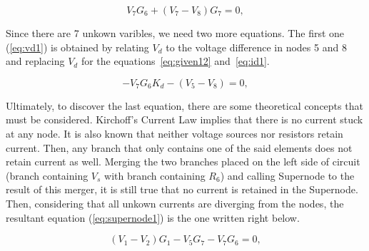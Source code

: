 \begin{equation}
  V_{7}G_{6} + (V_{7} - V_{8})G_{7} = 0,
  \label{eq:node17}
\end{equation}

Since there are 7 unkown varibles, we need two more equations. The first one (\ref{eq:vd1}) is obtained by relating $V_d$ to the voltage difference in nodes 5 and 8 and replacing $V_d$ for the equations~\ref{eq:given12} and~\ref{eq:id1}.

\begin{equation}
  -V_{7}G_{6}K_{d} - (V_{5} - V_{8}) = 0,
  \label{eq:vd1}
\end{equation}

Ultimately, to discover the last equation, there are some theoretical concepts that must be considered. Kirchoff's Current Law implies that there is no current stuck at any node. It is also known that neither voltage sources nor resistors retain current. Then, any branch that only contains one of the said elements does not retain current as well. Merging the two branches placed on the left side of circuit (branch containing $V_s$ with branch containing $R_6$) and calling Supernode to the result of this merger, it is still true that no current is retained in the Supernode. Then, considering that all unkown currents are diverging from the nodes, the resultant equation (\ref{eq:supernode1}) is the one written right below.

\begin{equation}
  (V_{1} - V_{2})G_{1} - V_{5}G_{7} - V_{7}G_{6} = 0,
  \label{eq:supernode1}
\end{equation}

